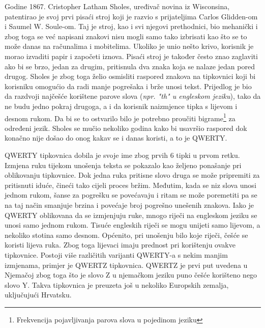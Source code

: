 \documentclass[times, utf8, zavrsni, numeric]{fer}
\begin{document}
Godine 1867. Cristopher Latham Sholes, uređivač novina iz Wisconsina, patentirao je svoj prvi pisaći stroj koji je razvio s prijateljima Carlos Glidden-om i Saumel W. Soule-om. Taj je stroj, kao i svi njegovi prethodnici, bio mehanički i zbog toga se već napisani znakovi nisu mogli samo tako izbrisati kao što se to može danas na računalima i mobitelima. Ukoliko je unio nešto krivo, korisnik je morao izvaditi papir i započeti iznova. Pisaći stroj je također često znao zaglaviti ako bi se brzo, jedan za drugim, pritisnula dva znaka koja se nalaze jedan pored drugog. Sholes je zbog toga želio osmisliti raspored znakova na tipkovnici koji bi korisniku omogućio da radi manje pogrešaka i brže unosi tekst. Prijedlog je bio da razdvoji najčešće korištene parove slova (\emph{npr. "th" u engleskom jeziku}), tako da ne budu jedno pokraj drugoga, a i da korisnik naizmjence tipka s lijevom i desnom rukom. Da bi se to ostvarilo bilo je potrebno proučiti bigrame\footnote{Frekvencija pojavljivanja parova slova u pojedinom jeziku} za određeni jezik. Sholes se mučio nekoliko godina kako bi usavršio raspored dok konačno nije došao do onog kakav se i danas koristi, a to je QWERTY.

QWERTY tipkovnica dobila je svoje ime zbog prvih 6 tipki u prvom retku. Izmjena ruku tijekom unošenja teksta se pokazalo kao željeno ponašanje pri oblikovanju tipkovnice. Dok jedna ruka pritisne slovo druga se može pripremiti za pritisnuti iduće, čineći tako cijeli proces bržim. Međutim, kada se niz slova unosi jednom rukom, šanse za pogrešku se povećavaju i ritam se može poremetiti pa se na taj način smanjuje brzina i povećaje broj pogrešno unešenih znakova. Iako je QWERTY oblikovana da se izmjenjuju ruke, mnogo riječi na engleskom jeziku se unosi samo jednom rukom. Tisuće engleskih riječi se mogu unijeti samo lijevom, a nekoliko stotina samo desnom. Općenito, pri unošenju bilo koje riječi, češće se koristi lijeva ruka. Zbog toga lijevaci imaju prednost pri korištenju ovakve tipkovnice. Postoji više različitih varijanti QWERTY-a s nekim manjim izmjenama, primjer je QWERTZ tipkovnica. QWERTZ je prvi put uvedena u Njemačoj zbog toga što je slovo Z u njemačkom jeziku puno češće korišteno nego slovo Y. Takva tipkovnica je preuzeta još u nekoliko Europskih zemalja, uključujući Hrvatsku.
\end{document}
